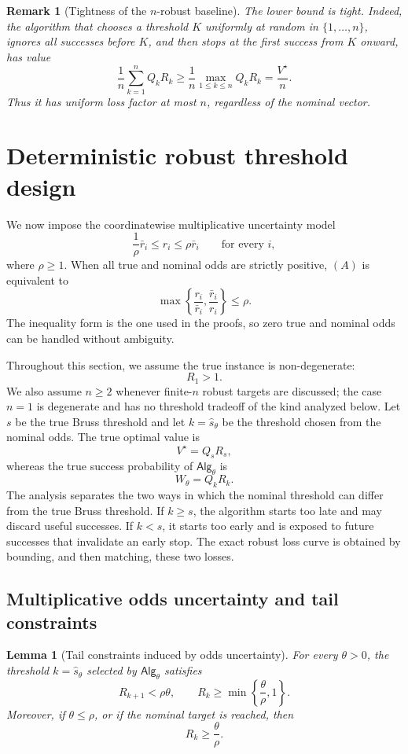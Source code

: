 \documentclass[11pt,a4paper]{article}
\newtheorem{lemma}{Lemma}
\newtheorem{remark}{Remark}
\newcommand{\alg}{\mathsf{Alg}}
\begin{document}
\begin{remark}[Tightness of the \(n\)-robust baseline]
\label{rem:n-robust-tight}
The lower bound is tight.  Indeed, the algorithm that chooses a threshold
\(K\) uniformly at random in \(\{1,\ldots,n\}\), ignores all successes before
\(K\), and then stops at the first success from \(K\) onward, has value
\[
  \frac1n\sum_{k=1}^n Q_kR_k
  \ge
  \frac1n\max_{1\le k\le n}Q_kR_k
  =
  \frac{V^\star}{n}.
\]
Thus it has uniform loss factor at most \(n\), regardless of the nominal vector.
\end{remark}

\section{Deterministic robust threshold design}
\label{sec:smoothness}

We now impose the coordinatewise multiplicative uncertainty model
\[
  \boxed{
  \frac1\rho\bar r_i\le r_i\le \rho\bar r_i
  }
  \qquad \text{for every }i,
  \tag{A}
\]
where \(\rho\ge1\).  When all true and nominal odds are
strictly positive, \((A)\) is equivalent to
\[
  \max\left\{\frac{r_i}{\bar r_i},\frac{\bar r_i}{r_i}\right\}\le\rho.
\]
The inequality form is the one used in the proofs, so zero true and nominal
odds can be handled without ambiguity.

Throughout this section, we assume the true instance is non-degenerate:
\[
  R_1>1.
\]
We also assume \(n\ge2\) whenever finite-\(n\) robust targets are discussed; the
case \(n=1\) is degenerate and has no threshold tradeoff of the kind analyzed
below.
Let \(s\) be the true Bruss threshold and let \(k=\hat s_\theta\) be the threshold
chosen from the nominal odds.  The true optimal value is
\[
  V^\star=Q_sR_s,
\]
whereas the true success probability of \(\alg_\theta\) is
\[
  W_\theta=Q_kR_k.
\]
The analysis separates the two ways in which the nominal threshold can differ
from the true Bruss threshold.  If \(k\ge s\), the algorithm starts too late and
may discard useful successes.  If \(k<s\), it starts too early and is exposed to
future successes that invalidate an early stop.  The exact robust loss curve is
obtained by bounding, and then matching, these two losses.

\subsection{Multiplicative odds uncertainty and tail constraints}

\begin{lemma}[Tail constraints induced by odds uncertainty]
\label{lem:tail-constraints}
For every \(\theta>0\), the threshold \(k=\hat s_\theta\) selected by
\(\alg_\theta\) satisfies
\[
  R_{k+1}<\rho\theta,
  \qquad
  R_k\ge \min\left\{\frac{\theta}{\rho},1\right\}.
\]
Moreover, if \(\theta\le\rho\), or if the nominal target is reached, then
\[
  R_k\ge\frac{\theta}{\rho}.
\]
\end{lemma}
\end{document}
